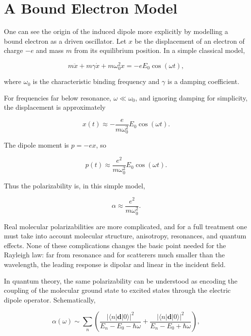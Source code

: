 \documentclass[11pt,a4paper]{article}
\begin{document}
\section{A Bound Electron Model}

One can see the origin of the induced dipole more explicitly by modelling a
bound electron as a driven oscillator. Let \(x\) be the displacement of an
electron of charge \(-e\) and mass \(m\) from its equilibrium position. In a
simple classical model,

\begin{equation}
m\ddot{x} + m\gamma \dot{x} + m\omega_0^2 x
=
-e E_0 \cos(\omega t),
\end{equation}

where \(\omega_0\) is the characteristic binding frequency and \(\gamma\) is a
damping coefficient.

For frequencies far below resonance, \(\omega \ll \omega_0\), and ignoring
damping for simplicity, the displacement is approximately

\begin{equation}
x(t) \approx -\frac{e}{m\omega_0^2}E_0 \cos(\omega t).
\end{equation}

The dipole moment is \(p=-ex\), so

\begin{equation}
p(t) \approx \frac{e^2}{m\omega_0^2}E_0\cos(\omega t).
\end{equation}

Thus the polarizability is, in this simple model,

\begin{equation}
\alpha \approx \frac{e^2}{m\omega_0^2}.
\end{equation}

Real molecular polarizabilities are more complicated, and for a full treatment
one must take into account molecular structure, anisotropy, resonances, and
quantum effects. None of these complications changes the basic point needed
for the Rayleigh law: far from resonance and for scatterers much smaller than
the wavelength, the leading response is dipolar and linear in the incident
field.

In quantum theory, the same polarizability can be understood as encoding the
coupling of the molecular ground state to excited states through the electric
dipole operator. Schematically,

\begin{equation}
\alpha(\omega)
\sim
\sum_n
\left(
\frac{|\langle n|\mathbf{d}|0\rangle|^2}{E_n-E_0-\hbar\omega}
+
\frac{|\langle n|\mathbf{d}|0\rangle|^2}{E_n-E_0+\hbar\omega}
\right),
\end{equation}
\end{document}
